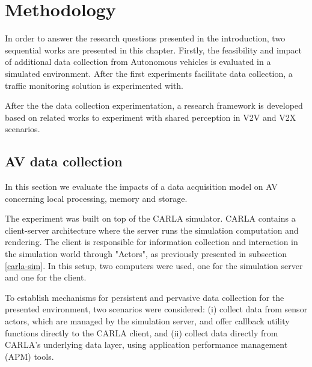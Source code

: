 \chapter{Methodology }


In order to answer the research questions presented in the introduction, two sequential works are presented in this chapter. Firstly, the feasibility and impact of additional data collection from Autonomous vehicles is evaluated in a simulated environment. After the first experiments facilitate data collection, a traffic monitoring solution is experimented with.

After the the data collection experimentation, a research framework is developed based on related works to experiment with shared perception in V2V and V2X scenarios.


\section{AV data collection}

In this section we evaluate the impacts of a data acquisition model on AV concerning local processing, memory and storage.

The experiment was built on top of the CARLA simulator. CARLA contains a client-server architecture where the server runs the simulation computation and rendering. The client is responsible for information collection and interaction in the simulation world through "Actors", as previously presented in subsection \ref{carla-sim}. In this setup, two computers were used, one for the simulation server and one for the client.

To establish mechanisms for persistent and pervasive data collection for the presented environment, two scenarios were considered: (i) collect data from sensor actors, which are managed by the simulation server, and offer callback utility functions directly to the CARLA client, and (ii) collect data directly from CARLA’s underlying data layer, using application performance management (APM) tools.

